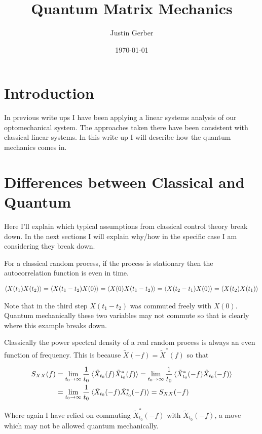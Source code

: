 \documentclass[12pt]{article}
\begin{document}
\title{Quantum Matrix Mechanics}
\author{Justin Gerber}
\date{\today}
\maketitle

\section{Introduction}
In previous write ups I have been applying a linear systems analysis of our optomechanical system. The approaches taken there have been consistent with classical linear systems. In this write up I will describe how the quantum mechanics comes in.

\section{Differences between Classical and Quantum}

Here I'll explain which typical assumptions from classical control theory break down. In the next sections I will explain why/how in the specific case I am considering they break down.

For a classical random process, if the process is stationary then the autocorrelation function is even in time.

\begin{align}
\braket{X(t_1)X(t_2)} = \braket{X(t_1-t_2)X(0)} = \braket{X(0)X(t_1-t_2)} = \braket{X(t_2-t_1)X(0)} = \braket{X(t_2)X(t_1)}
\end{align}

Note that in the third step $X(t_1-t_2)$ was commuted freely with $X(0)$. Quantum mechanically these two variables may not commute so that is clearly where this example breaks down.

Classically the power spectral density of a real random process is always an even function of frequency. This is because $\tilde{X}(-f) = \tilde{X}^*(f)$ so that

\begin{align}
S_{XX}(f) &= \lim_{t_0\rightarrow \infty} \frac{1}{t_0} \braket{\tilde{X}_{t_0}(f) \tilde{X}_{t_0}^*(f)} =  \lim_{t_0\rightarrow \infty} \frac{1}{t_0} \braket{\tilde{X}_{t_0}^*(-f) \tilde{X}_{t_0}(-f)}\\
&=  \lim_{t_0\rightarrow \infty} \frac{1}{t_0} \braket{\tilde{X}_{t_0}(-f) \tilde{X}_{t_0}^*(-f)} = S_{XX}(-f)
\end{align}

Where again I have relied on commuting $\tilde{X}_{t_0}^*(-f)$ with $\tilde{X}_{t_0}(-f)$, a move which may not be allowed quantum mechanically.
\end{document}
